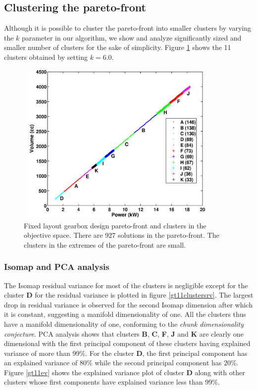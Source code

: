 \subsection{Clustering the pareto-front}
Although it is possible to cluster the pareto-front into smaller clusters
by varying the $k$ parameter in our algorithm, we show and analyze
significantly sized and smaller number of clusters for the sake of
simplicity. Figure \ref{gt11Clusters} shows the 11 clusters obtained by
setting $k = 6.0$.

\begin{figure}[ht]\begin{center}
 \includegraphics[width=100mm, height=80mm]{dia/gt11cpareto1.eps}
 \caption{Fixed layout gearbox design pareto-front and clusters in the
   objective space. There are 927 solutions in the pareto-front. The
   clusters in the extremes of the pareto-front are small.}
 \label{gt11Clusters}
\end{center}\end{figure}

\subsubsection{Isomap and PCA analysis}

The Isomap residual variance for most of the clusters is negligible except
for the cluster \textbf{D} for the residual variance is plotted in figure
\ref{gt11clustersrv}. The largest drop in residual variance is observed for
the second Isomap dimension after which it is constant, suggesting a
manifold dimensionality of one. All the clusters thus have a manifold
dimensionality of one, conforming to the {\em chunk dimensionality
  conjecture}. PCA analysis shows that clusters \textbf{B}, \textbf{C},
\textbf{F}, \textbf{J} and \textbf{K} are clearly one dimensional with the
first principal component of these clusters having explained variance of
more than 99\%. For the cluster \textbf{D}, the first principal component
has an explained variance of 80\% while the second principal component has
20\%. Figure \ref{gt11ev} shows the explained variance plot of cluster
\textbf{D} along with other clusters whose first components have explained
variance less than 99\%.

